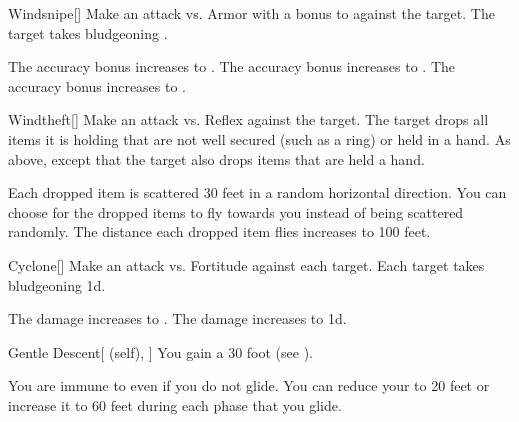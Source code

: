 \lowercase{\hypertarget{spell:Windsnipe}{}}\label{spell:Windsnipe}
\begin{freeability}[Rank 2]{\hypertarget{spell:Windsnipe}{Windsnipe}}[]
Make an attack vs. Armor with a  bonus to  against the target.
\hit The target takes bludgeoning .

\rankline
{} The accuracy bonus increases to .
 The accuracy bonus increases to .
 The accuracy bonus increases to .
\end{freeability}
\vspace{0.25em}



\lowercase{\hypertarget{spell:Windtheft}{}}\label{spell:Windtheft}
\begin{freeability}[Rank 2]{\hypertarget{spell:Windtheft}{Windtheft}}[]
Make an attack vs. Reflex against the target.
\hit The target drops all items it is holding that are not well secured (such as a ring) or held in a hand.
\crit As above, except that the target also drops items that are held a hand.

\rankline
{} Each dropped item is scattered 30 feet in a random horizontal direction.
 You can choose for the dropped items to fly towards you instead of being scattered randomly.
 The distance each dropped item flies increases to 100 feet.
\end{freeability}
\vspace{0.25em}



\lowercase{\hypertarget{spell:Cyclone}{}}\label{spell:Cyclone}
\begin{freeability}[Rank 3]{\hypertarget{spell:Cyclone}{Cyclone}}[]
Make an attack vs. Fortitude against each target.
\hit Each target takes bludgeoning  \minus1d.

\rankline
{} The damage increases to .
 The damage increases to  \plus1d.
\end{freeability}
\vspace{0.25em}



\lowercase{\hypertarget{spell:Gentle Descent}{}}\label{spell:Gentle Descent}
\begin{attuneability}[Rank 3]{\hypertarget{spell:Gentle Descent}{Gentle Descent}}[ (self), ]
You gain a 30 foot  (see ).

\rankline
{} You are immune to  even if you do not glide.
 You can reduce your  to 20 feet or increase it to 60 feet during each phase that you glide.
\end{attuneability}
\vspace{0.25em}



